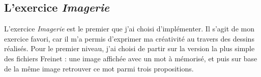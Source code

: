 




\subsection{L'exercice \textit{Imagerie}}
L'exercice \textit{Imagerie} est le premier que j'ai choisi d'implémenter. Il s'agit de mon exercice favori, car il m'a permis d'exprimer ma créativité au travers des dessins réalisés. Pour le premier niveau, j'ai choisi de partir sur la version la plus simple des fichiers Freinet : une image affichée avec un mot à mémorisé, et puis sur base de la même image retrouver ce mot parmi trois propositions.\\

